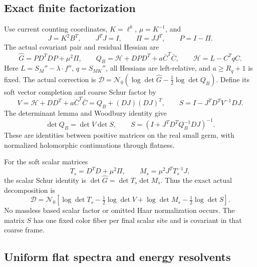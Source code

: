 \documentclass[11pt]{article}
\theoremstyle{remark}
\begin{document}
\subsection{Exact finite factorization}
\label{svc-factor-section}

Use current counting coordinates, $K=\ell^k$, $\mu=K^{-1}$, and
\begin{equation}
 J=K^2B^T,\qquad J^TJ=I,\qquad \Pi=JJ^T,\qquad P=I-\Pi.
 \label{svc-projectors}
\end{equation}
The actual covariant pair and residual Hessian are
\begin{equation}
 \widehat G=PD^TDP+\mu^2\Pi,\qquad
 Q_B=\mathcal H+DPD^T+a\bar C^T\bar C,
 \qquad \mathcal H=L-C^TqC.
 \label{svc-actual}
\end{equation}
Here $L=S_M''-\lambda\cdot f''$, $q=S_{MK}''$, all Hessians are
left-relative, and $a\ge R_q+1$ is fixed. The actual correction is
$\mathcal D=\mathcal N_0(\log\det\widehat G-\tfrac12\log\det Q_B)$.
Define its soft vector completion and coarse Schur factor by
\begin{equation}
 V=\mathcal H+DD^T+a\bar C^T\bar C
        =Q_B+(DJ)(DJ)^T,
 \qquad S=I-J^TD^TV^{-1}DJ.
 \label{svc-soft-vector}
\end{equation}
The determinant lemma and Woodbury identity give
\begin{equation}
 \det Q_B=\det V\det S,\qquad
 S=(I+J^TD^TQ_B^{-1}DJ)^{-1}.
 \label{svc-schur}
\end{equation}
These are identities between positive matrices on the real small germ,
with normalized holomorphic continuations through flatness.

For the soft scalar matrices
\begin{equation}
 T_s=D^TD+\mu^2\Pi,\qquad M_s=\mu^2J^TT_s^{-1}J,
 \label{svc-soft-scalar}
\end{equation}
the scalar Schur identity is $\det\widehat G=\det T_s\det M_s$.
Thus the exact actual decomposition is
\begin{equation}
 \boxed{\displaystyle
 \mathcal D=\mathcal N_0\left[
 \log\det T_s-\tfrac12\log\det V
                 +\log\det M_s-\tfrac12\log\det S\right].}
 \label{svc-four-factor}
\end{equation}
No massless based scalar factor or omitted Haar normalization occurs.
The matrix $S$ has one fixed color fiber per final scalar site and is
covariant in that coarse frame.

\subsection{Uniform flat spectra and energy resolvents}
\label{svc-flat-section}
\end{document}
